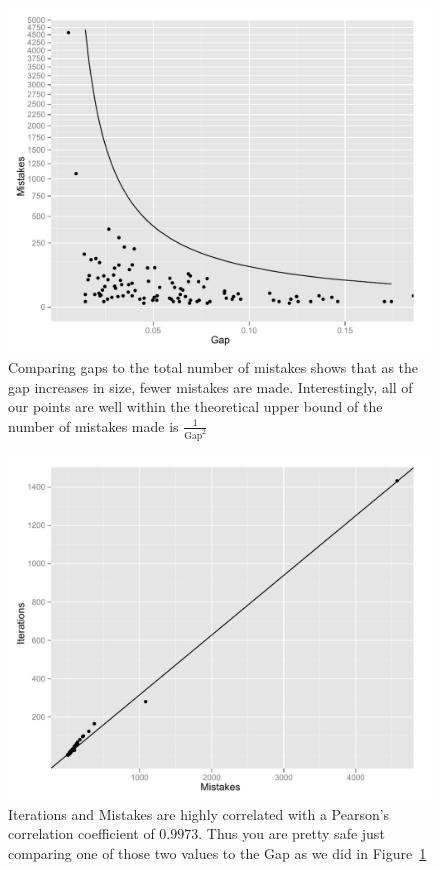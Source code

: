 \documentclass[12pt]{article}
\begin{document}
\begin{enumerate}
\begin{enumerate}
\begin{figure}[htbp]
\begin{center}
\includegraphics[scale=0.7]{ex1_gap_vs_Mistakes}
\caption{Comparing gaps to the total number of mistakes shows that as the gap increases in size, fewer mistakes are made. Interestingly, all of our points are well within the theoretical upper bound of the number of mistakes made is $\frac{1}{\text{Gap}^2}$}
\label{fig:gvm}
\end{center}

\end{figure}
\begin{figure}[htbp]
\begin{center}
\includegraphics[scale=0.7]{ex1_iteration_mistakes}
\caption{Iterations and Mistakes are highly correlated with a Pearson's correlation coefficient of $0.9973$. Thus you are pretty safe just comparing one of those two values to the Gap as we did in Figure~\ref{fig:gvm}}
\label{fig:mvi}
\end{center}
\end{figure}



\end{enumerate}
\end{enumerate}
\end{document}
